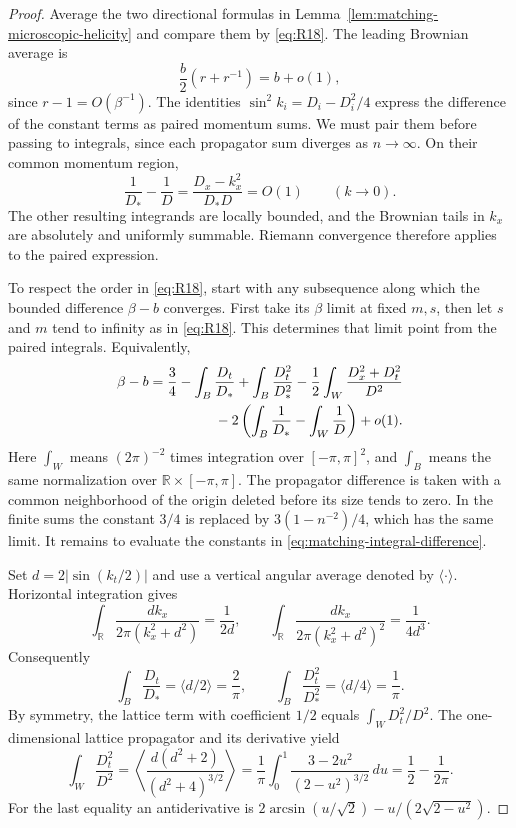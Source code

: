 \begin{proof}
Average the two directional formulas in
Lemma~\ref{lem:matching-microscopic-helicity} and compare them by
\eqref{eq:R18}. The leading Brownian average is
\[
 \frac b2(r+r^{-1})=b+o(1),
\]
since $r-1=O(\beta^{-1})$. The identities
$\sin^2 k_i=D_i-D_i^2/4$ express the difference of the constant terms as
paired momentum sums. We must pair them before passing to integrals,
since each propagator sum diverges as $n\to\infty$. On their common
momentum region,
\[
 \frac1{D_*}-\frac1D
   =\frac{D_x-k_x^2}{D_*D}=O(1)
 \qquad(k\to0).
\]
The other resulting integrands are locally bounded, and the Brownian
tails in $k_x$ are absolutely and uniformly summable. Riemann convergence
therefore applies to the paired expression.

To respect the order in \eqref{eq:R18}, start with any subsequence along
which the bounded difference $\beta-b$ converges. First take its
$\beta$ limit at fixed $m,s$, then let $s$ and $m$ tend to infinity as
in \eqref{eq:R18}. This determines that limit point from the paired
integrals. Equivalently,
\begin{equation}
 \begin{split}
 \beta-b={}&\frac34-\int_B\frac{D_t}{D_*}
                  +\int_B\frac{D_t^2}{D_*^2}
           -\frac12\int_W\frac{D_x^2+D_t^2}{D^2}\\
 &\hspace{12mm}-2\left(\int_B\frac1{D_*}-\int_W\frac1D\right)+o(1).
 \end{split}
 \label{eq:matching-integral-difference}
\end{equation}
Here $\int_W$ means $(2\pi)^{-2}$ times integration over
$[-\pi,\pi]^2$, and $\int_B$ means the same normalization over
$\mathbb R\times[-\pi,\pi]$. The propagator difference is taken with a
common neighborhood of the origin deleted before its size tends to zero.
In the finite sums the constant $3/4$ is replaced by
$3(1-n^{-2})/4$, which has the same limit. It remains to evaluate the
constants in \eqref{eq:matching-integral-difference}.

Set $d=2|\sin(k_t/2)|$ and use a vertical angular average denoted by
$\langle\cdot\rangle$. Horizontal integration gives
\[
 \int_{\mathbb R}\frac{dk_x}{2\pi(k_x^2+d^2)}=\frac1{2d},
 \qquad
 \int_{\mathbb R}\frac{dk_x}{2\pi(k_x^2+d^2)^2}=\frac1{4d^3}.
\]
Consequently
\[
 \int_B\frac{D_t}{D_*}=\langle d/2\rangle=\frac2\pi,
 \qquad
 \int_B\frac{D_t^2}{D_*^2}=\langle d/4\rangle=\frac1\pi.
\]
By symmetry, the lattice term with coefficient $1/2$ equals
$\int_W D_t^2/D^2$. The one-dimensional lattice propagator and its
derivative yield
\[
 \int_W\frac{D_t^2}{D^2}
   =\left\langle\frac{d(d^2+2)}{(d^2+4)^{3/2}}\right\rangle
   =\frac1\pi\int_0^1\frac{3-2u^2}{(2-u^2)^{3/2}}\,du
   =\frac12-\frac1{2\pi}.
\]
For the last equality an antiderivative is
$2\arcsin(u/\sqrt2)-u/(2\sqrt{2-u^2})$.


\end{proof}
